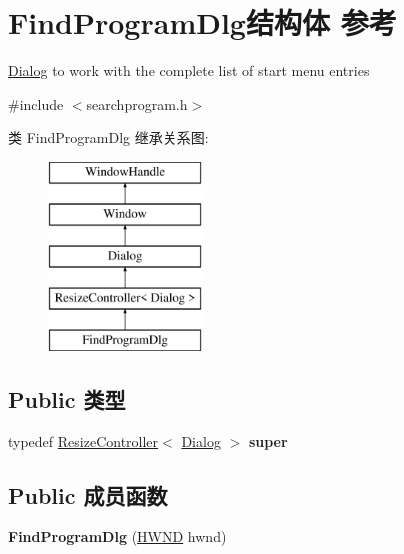 \hypertarget{struct_find_program_dlg}{}\section{Find\+Program\+Dlg结构体 参考}
\label{struct_find_program_dlg}


\hyperlink{struct_dialog}{Dialog} to work with the complete list of start menu entries  




{\ttfamily \#include $<$searchprogram.\+h$>$}

类 Find\+Program\+Dlg 继承关系图\+:\begin{figure}[H]
\begin{center}
\leavevmode
\includegraphics[height=5.000000cm]{struct_find_program_dlg}
\end{center}
\end{figure}
\subsection*{Public 类型}
\begin{DoxyCompactItemize}
\item 
\mbox{\label{struct_find_program_dlg_a7de98a6cbf6902d3f4cf467e1ea10a59}} 
typedef \hyperlink{struct_resize_controller}{Resize\+Controller}$<$ \hyperlink{struct_dialog}{Dialog} $>$ {\bfseries super}
\end{DoxyCompactItemize}
\subsection*{Public 成员函数}
\begin{DoxyCompactItemize}
\item 
\mbox{\label{struct_find_program_dlg_a27491f1f74da4a61653078bb8e1a4d68}} 
{\bfseries Find\+Program\+Dlg} (\hyperlink{interfacevoid}{H\+W\+ND} hwnd)
\end{DoxyCompactItemize}
